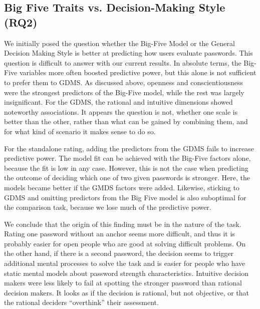 \subsection{Big Five Traits vs. Decision-Making Style (RQ2)}
We initially posed the question whether the Big-Five Model or the General Decision Making Style is better at predicting how users evaluate passwords. This question is difficult to answer with our current results. In absolute terms, the Big-Five variables more often boosted predictive power, but this alone is not sufficient to prefer them to GDMS. As discussed above, openness and conscientiousness were the strongest predictors of the Big-Five model, while the rest was largely insignificant. For the GDMS, the rational and intuitive dimensions showed noteworthy associations. It appears the question is not, whether one scale is better than the other, rather than what can be gained by combining them, and for what kind of scenario it makes sense to do so. 

For the standalone rating, adding the predictors from the GDMS fails to increase predictive power. The model fit can be achieved with the Big-Five factors alone, because the fit is low in any case. However, this is not the case when predicting the outcome of deciding which one of two given passwords is stronger. Here, the models became better if the GMDS factors were added. Likewise, sticking to GDMS and omitting predictors from the Big Five model is also suboptimal for the comparison task, because we lose much of the predictive power. 

We conclude that the origin of this finding must be in the nature of the task. Rating one password without an anchor seems more difficult, and thus it is probably easier for open people who are good at solving difficult problems. On the other hand, if there is a second password, the decision seems to trigger additional mental processes to solve the task and is easier for people who have static mental models about password strength characteristics. Intuitive decision makers were less likely to fail at spotting the stronger password than rational decision makers. It looks as if the decision is rational, but not objective, or that the rational deciders ``overthink'' their assessment. 

